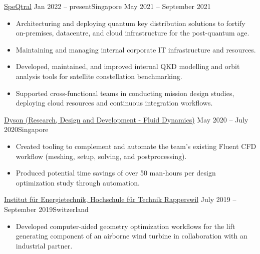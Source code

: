 \documentclass[10.5pt,a4paper,ragged2e,withhyper]{altacv}
\begin{document}
\begin{paracol}{2}


  {\href{https://speqtral.space}{SpeQtral}}
  {Jan 2022 -- present}{Singapore}
  {}{May 2021 -- September 2021}{}
\begin{itemize}
\item Architecturing and deploying quantum key distribution solutions to fortify on-premises, datacentre, and cloud infrastructure for the post-quantum age.
\item Maintaining and managing internal corporate IT infrastructure and resources.
\item Developed, maintained, and improved internal QKD modelling and orbit analysis tools for satellite constellation benchmarking.
\item Supported cross-functional teams in conducting mission design studies, deploying cloud resources and continuous integration workflows.
\end{itemize}

\divider

  {\href{https://careers.dyson.com/en-gb/what-you-can-do/engineer/research/}{Dyson (Research, Design and Development - Fluid Dynamics)}}
  {May 2020 -- July 2020}{Singapore}
\begin{itemize}
\item Created tooling to complement and automate the team's existing Fluent CFD workflow (meshing, setup, solving, and postprocessing).
\item Produced potential time savings of over 50 man-hours per design optimization study through automation.
\end{itemize}

\divider

  {\href{https://www.ost.ch/de/forschung-und-dienstleistungen/technik/erneuerbare-energien-und-umwelttechnik/iet-institut-fuer-energietechnik}{Institut für Energietechnik, Hochschule für Technik Rapperswil}}
  {July 2019 -- September 2019}{Switzerland}
\begin{itemize}
\item Developed computer-aided geometry optimization workflows for the lift generating component of an airborne wind turbine in collaboration with an industrial partner.
\end{itemize}


\end{paracol}
\end{document}
